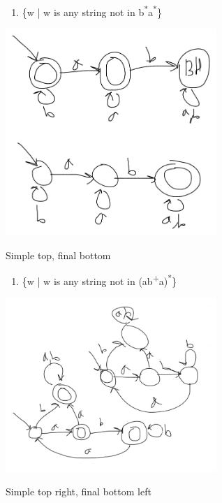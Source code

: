 \documentclass[letterpaper, 12pt]{article}
\begin{document}
\begin{enumerate}
\item \{w | w is any string not in b\textsuperscript{*}a\textsuperscript{*}\}
\end{enumerate}
\begin{center}
\includegraphics[width=8cm]{hw2/2-2.png}
\end{center}
Simple top, final bottom

\begin{enumerate}
\item \{w | w is any string not in (ab\textsuperscript{+}a)\textsuperscript{*}\}
\end{enumerate}
\begin{center}
\includegraphics[width=8cm]{hw2/2-3.png}
\end{center}
Simple top right, final bottom left
\end{document}
